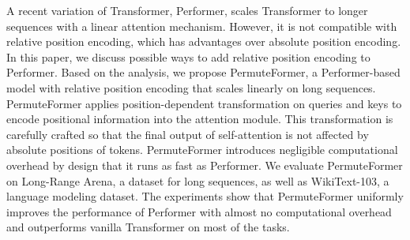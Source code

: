 A recent variation of Transformer, Performer, scales Transformer to longer sequences with a linear attention mechanism. However, it is not compatible with relative position encoding, which has advantages over absolute position encoding. In this paper, we discuss possible ways to add relative position encoding to Performer. Based on the analysis, we propose PermuteFormer, a Performer-based model with relative position encoding that scales linearly on long sequences. PermuteFormer applies position-dependent transformation on queries and keys to encode positional information into the attention module. This transformation is carefully crafted so that the final output of self-attention is not affected by absolute positions of tokens. PermuteFormer introduces negligible computational overhead by design that it runs as fast as Performer. We evaluate PermuteFormer on Long-Range Arena, a dataset for long sequences, as well as WikiText-103, a language modeling dataset. The experiments show that PermuteFormer uniformly improves the performance of Performer with almost no computational overhead and outperforms vanilla Transformer on most of the tasks.
